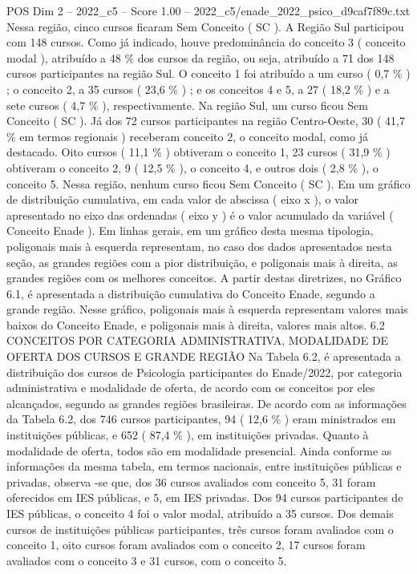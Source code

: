 \begin{textsample}{POS Dim 2 – 2022\_c5 – Score 1.00 – 2022\_c5/enade\_2022\_psico\_d9caf7f89c.txt}
Nessa região, cinco cursos ficaram Sem Conceito ( SC ).
A Região Sul participou com 148 cursos.
Como já indicado, houve predominância do conceito 3 ( conceito modal ), atribuído a 48 \% dos cursos da região, ou seja, atribuído a 71 dos 148 cursos participantes na região Sul.
O conceito 1 foi atribuído a um curso ( 0,7 \% ) ; o conceito 2, a 35 cursos ( 23,6 \% ) ; e os conceitos 4 e 5, a 27 ( 18,2 \% ) e a sete cursos ( 4,7 \% ), respectivamente.
Na região Sul, um curso ficou Sem Conceito ( SC ).
Já dos 72 cursos participantes na região Centro-Oeste, 30 ( 41,7 \% em termos regionais ) receberam conceito 2, o conceito modal, como já destacado.
Oito cursos ( 11,1 \% ) obtiveram o conceito 1, 23 cursos ( 31,9 \% ) obtiveram o conceito 2, 9 ( 12,5 \% ), o conceito 4, e outros dois ( 2,8 \% ), o conceito 5.
Nessa região, nenhum curso ficou Sem Conceito ( SC ).
Em um gráfico de distribuição cumulativa, em cada valor de abscissa ( eixo x ), o valor apresentado no eixo das ordenadas ( eixo y ) é o valor acumulado da variável ( Conceito Enade ).
Em linhas gerais, em um gráfico desta mesma tipologia, poligonais mais à esquerda representam, no caso dos dados apresentados nesta seção, as grandes regiões com a pior distribuição, e poligonais mais à direita, as grandes regiões com os melhores conceitos.
A partir destas diretrizes, no Gráfico 6.1, é apresentada a distribuição cumulativa do Conceito Enade, segundo a grande região.
Nesse gráfico, poligonais mais à esquerda representam valores mais baixos do Conceito Enade, e poligonais mais à direita, valores mais altos. 6.2 CONCEITOS POR CATEGORIA ADMINISTRATIVA, MODALIDADE DE OFERTA DOS CURSOS E GRANDE REGIÃO Na Tabela 6.2, é apresentada a distribuição dos cursos de Psicologia participantes do Enade/2022, por categoria administrativa e modalidade de oferta, de acordo com os conceitos por eles alcançados, segundo as grandes regiões brasileiras.
De acordo com as informações da Tabela 6.2, dos 746 cursos participantes, 94 ( 12,6 \% ) eram ministrados em instituições públicas, e 652 ( 87,4 \% ), em instituições privadas.
Quanto à modalidade de oferta, todos são em modalidade presencial.
Ainda conforme as informações da mesma tabela, em termos nacionais, entre instituições públicas e privadas, observa -se que, dos 36 cursos avaliados com conceito 5, 31 foram oferecidos em IES públicas, e 5, em IES privadas.
Dos 94 cursos participantes de IES públicas, o conceito 4 foi o valor modal, atribuído a 35 cursos.
Dos demais cursos de instituições públicas participantes, três cursos foram avaliados com o conceito 1, oito cursos foram avaliados com o conceito 2, 17 cursos foram avaliados com o conceito 3 e 31 cursos, com o conceito 5.

\end{textsample}
